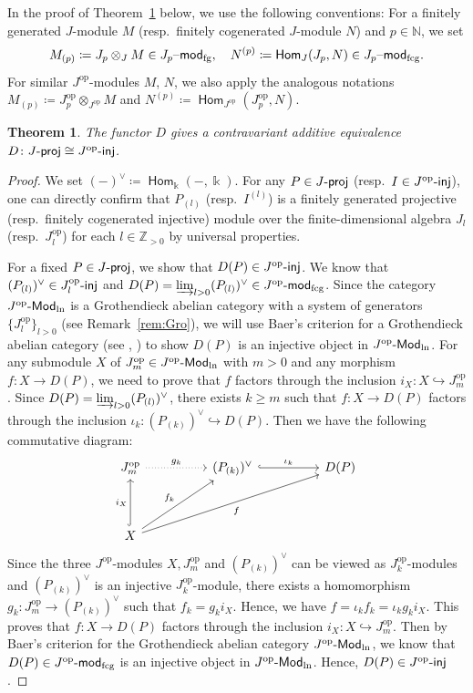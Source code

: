 \documentclass[12pt]{amsart}
\newtheorem{theorem}{Theorem}[section]
\theoremstyle{definition}
\theoremstyle{remark}
\numberwithin{equation}{section}
\newcommand{\opname}[1]{\operatorname{\mathsf{#1}}}
\newcommand{\Hom}{\opname{Hom}}
\newcommand{\injc}{\mathchar`-\mathsf{inj}}
\newcommand{\projc}{\mathchar`-\mathsf{proj}}
\newcommand{\modfg}{\mathchar`-\mathsf{mod}_{\mathrm{fg}}}
\newcommand{\modfcg}{\mathchar`-\mathsf{mod}_{\mathrm{fcg}}}
\newcommand{\op}{\mathrm{op}}
\newcommand{\Modln}{\mathchar`-\mathsf{Mod}_{\mathrm{ln}}}
\begin{document}
In the proof of Theorem~\ref{thm:Dequiv1} below, we use the following conventions:
For a finitely generated $J$-module $M$ (resp.\ finitely cogenerated $J$-module $N$) and $p\in\mathbb N$, we set
\[
M_{(p)}\coloneqq J_p\otimes_J M\in J_p \mathchar`-\modfg,\quad N^{(p)}\coloneqq \Hom_J(J_p,N)\in J_p \mathchar`-\modfcg. 
\]
 For similar $J^\op$-modules $M$, $N$, we also apply the analogous notations $M_{(p)}\coloneqq J_p^\op\otimes_{J^\op} M$ and $N^{(p)}\coloneqq \Hom_{J^\op}(J_p^\op,N)$.
\begin{theorem}\label{thm:Dequiv1}
   The functor $D$ gives a contravariant additive equivalence $D\colon J\projc \cong J^\op\injc$.
\end{theorem}
\begin{proof}
We set $(-)^\vee \coloneqq \Hom_{\Bbbk }(-, \Bbbk )$. For any $P \in J\projc$ (resp.\ $I \in J^\op \injc$), one can directly confirm that $P_{(l)}$ (resp.\ $I^{(l)}$) is a finitely generated projective (resp.\ finitely cogenerated injective) module over the finite-dimensional algebra $J_l$ (resp.\ $J_l^\op$) for each $l \in \mathbb{Z}_{>0}$ by universal properties.

For a fixed $P\in J\projc$, we show that $D(P)\in J^\op\injc$. We know that $(P_{(l)})^\vee \in J^\op_l\injc$ and $D(P)=\varinjlim_{l>0} (P_{(l)})^\vee\in J^\op\modfcg$. Since the category $J^\op\Modln$ is a Grothendieck abelian category with a system of generators  $ \{J_l^\op\}_{l>0}$ (see Remark~\ref{rem:Gro}), we will use Baer's criterion for a Grothendieck abelian category (see \cite[\S 1.10,~Lemme~1]{Tohoku}, \cite[Prop. 8.4.7]{KS06}) to show $D(P)$ is an injective object in $J^\op\Modln$. For
any submodule $X$ of $J_m^{\op}\in J^\op\Modln$ with $m>0$ and any morphism $f\colon X\to D(P)$, we need to prove that $f$ factors through the inclusion $i_X\colon X\hookrightarrow J_m^{\op}$. Since $D(P)=\varinjlim_{l>0} (P_{(l)})^\vee$,  there exists $k\geq m$ such that $f\colon X\to D(P)$ factors through the inclusion $\iota_{k}\colon (P_{(k)})^\vee \hookrightarrow D(P)$.  Then we have the following commutative diagram:
\[\begin{tikzcd}
	{J_m^\op} && {(P_{(k)})^\vee} && {D(P)} \\
	\\
	X
	\arrow[dotted,"{g_k}", from=1-1, to=1-3]
	\arrow["{\iota_k}", hook, from=1-3, to=1-5]
	\arrow["{i_X}", hook, from=3-1, to=1-1]
	\arrow["{f_k}", from=3-1, to=1-3]
	\arrow["f"', from=3-1, to=1-5]
\end{tikzcd}\]
Since the three $J^\op$-modules $X, J_m^{\op}$ and $(P_{(k)})^\vee$ can be viewed as $J^\op_k$-modules and $(P_{(k)})^\vee$ is an injective  $J^\op_k$-module, there exists a homomorphism $g_k\colon J_m^{\op}\to (P_{(k)})^\vee$ such that $f_k=g_ki_X$. Hence, we have
$f=\iota_kf_k=\iota_kg_ki_X$. This proves that $f\colon X \to D(P)$ factors through the inclusion $i_X\colon X\hookrightarrow J_m^{\op}$. Then by  Baer's criterion for the Grothendieck abelian category $J^\op\Modln$, we know that $D(P)\in J^\op\modfcg$ is an injective object in $J^\op\Modln$. Hence, $D(P)\in J^\op\injc$.



\end{proof}
\end{document}
